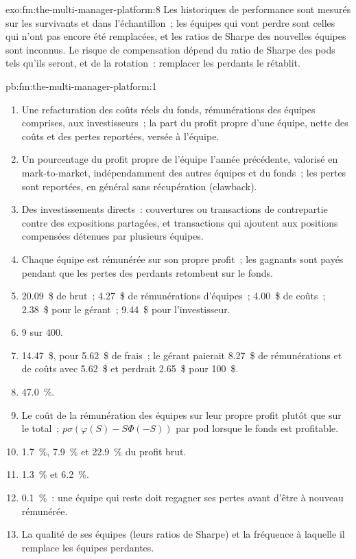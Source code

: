 \begin{solution}{exo:fm:the-multi-manager-platform:8}
Les historiques de performance sont mesurés sur les survivants et dans l'échantillon~; les équipes qui vont perdre sont celles qui n'ont pas encore été remplacées, et les ratios de Sharpe des nouvelles équipes sont
inconnus. Le risque de compensation dépend du ratio de Sharpe des pods tels qu'ils seront, et de la rotation~: remplacer les perdants le rétablit.
\end{solution}

\begin{solution}{pb:fm:the-multi-manager-platform:1}
\begin{enumerate}
\item Une refacturation des coûts réels du fonds, rémunérations des équipes comprises, aux investisseurs~; la part du profit propre d'une équipe, nette des coûts et des pertes reportées,
versée à l'équipe.
\item Un pourcentage du profit propre de l'équipe l'année précédente, valorisé en mark-to-market, indépendamment des autres équipes et du fonds~; les pertes sont reportées,
en général sans récupération (clawback).
\item Des investissements directs~: couvertures ou transactions de contrepartie contre des expositions partagées, et transactions qui ajoutent aux positions compensées détenues par plusieurs équipes.
\item Chaque équipe est rémunérée sur son propre profit~; les gagnants sont payés pendant que les pertes des perdants retombent sur le fonds.
\item 20.09~\$ de brut~; 4.27~\$ de rémunérations d'équipes~; 4.00~\$ de coûts~; 2.38~\$ pour le gérant~; 9.44~\$ pour l'investisseur.
\item 9 sur 400.
\item 14.47~\$, pour 5.62~\$ de frais~; le gérant paierait 8.27~\$ de rémunérations et de coûts avec 5.62~\$ et perdrait 2.65~\$ pour 100~\$.
\item 47.0~\%.
\item Le coût de la rémunération des équipes sur leur propre profit plutôt que sur le total~;
$p\sigma(\varphi(S)-S\Phi(-S))$ par pod lorsque le fonds est profitable.
\item 1.7~\%, 7.9~\% et 22.9~\% du profit brut.
\item 1.3~\% et 6.2~\%.
\item 0.1~\%~: une équipe qui reste doit regagner ses pertes avant d'être à nouveau rémunérée.
\item La qualité de ses équipes (leurs ratios de Sharpe) et la fréquence à laquelle il remplace les équipes perdantes.

\end{enumerate}
\end{solution}
